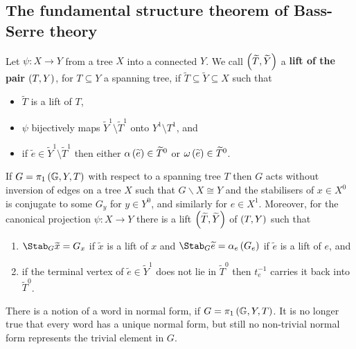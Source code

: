 \subsection{The fundamental structure theorem of Bass-Serre theory}

\begin{definition}
Let $ \psi : X \to Y $ from a tree $ X $ into a connected $ Y $. We call $ \br{\widetilde{T}, \widetilde{Y}} $ a \textbf{lift of the pair $ \br{T, Y} $}, for $ T \subseteq Y $ a spanning tree, if $ \widetilde{T} \subseteq \widetilde{Y} \subseteq X $ such that
\begin{itemize}
\item $ \widetilde{T} $ is a lift of $ T $,
\item $ \psi $ bijectively maps $ \widetilde{Y}^1 \setminus \widetilde{T}^1 $ onto $ Y^1 \setminus T^1 $, and
\item if $ \widetilde{e} \in \widetilde{Y}^1 \setminus \widetilde{T}^1 $ then either $ \alpha\br{\widetilde{e}} \in \widetilde{T}^0 $ or $ \omega\br{\widetilde{e}} \in \widetilde{T}^0 $.
\end{itemize}
\end{definition}

\begin{theorem}
\label{thm:2.7.2}
If $ G = \pi_1\br{\GG, Y, T} $ with respect to a spanning tree $ T $ then $ G $ acts without inversion of edges on a tree $ X $ such that $ G \backslash X \cong Y $ and the stabilisers of $ x \in X^0 $ is conjugate to some $ G_y $ for $ y \in Y^0 $, and similarly for $ e \in X^1 $. Moreover, for the canonical projection $ \psi : X \to Y $ there is a lift $ \br{\widetilde{T}, \widetilde{Y}} $ of $ \br{T, Y} $ such that
\begin{enumerate}
\item $ \Stab_G \widetilde{x} = G_x $ if $ \widetilde{x} $ is a lift of $ x $ and $ \Stab_G \widetilde{e} = \alpha_e\br{G_e} $ if $ \widetilde{e} $ is a lift of $ e $, and
\item if the terminal vertex of $ \widetilde{e} \in \widetilde{Y}^1 $ does not lie in $ \widetilde{T}^0 $ then $ t_e^{-1} $ carries it back into $ \widetilde{T}^0 $.
\end{enumerate}
\end{theorem}


\begin{remark*}
There is a notion of a word in normal form, if $ G = \pi_1\br{\GG, Y, T} $. It is no longer true that every word has a unique normal form, but still no non-trivial normal form represents the trivial element in $ G $.
\end{remark*}

